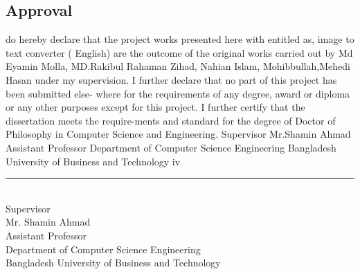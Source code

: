 \begin{center}
    \section*{Approval}
\end{center}


 do hereby declare that the project works presented here with entitled as, image to text converter ( English) are the outcome of the original works carried out by Md Eyamin Molla, MD.Rakibul Rahaman Zihad, Nahian Islam, Mohibbullah,Mehedi Hasan under my
supervision. I further declare that no part of this project has been submitted else-
where for the requirements of any degree, award or diploma or any other purposes
except for this project. I further certify that the dissertation meets the require-ments and standard for the degree of Doctor of Philosophy in Computer Science
and Engineering.
Supervisor
Mr.Shamin Ahmad
Assistant Professor
Department of Computer Science Engineering
Bangladesh University of Business and Technology
iv


\vspace{20mm}



\vspace{15mm}
\noindent\rule{9.3cm}{0.2pt} \\
Supervisor \\
Mr. Shamin Ahmad \\
Assistant Professor \\
Department of Computer Science Engineering \\
Bangladesh University of Business and Technology\\
